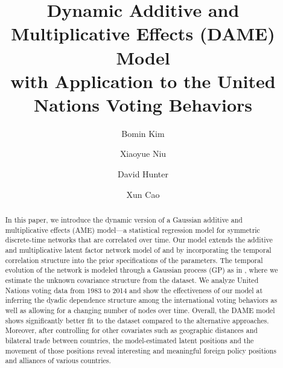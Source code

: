 \documentclass[a4paper]{article}
\title{Dynamic Additive and Multiplicative Effects (DAME) Model\\
	with Application to the United Nations Voting Behaviors}
\author[1]{Bomin Kim}
\author[1]{Xiaoyue Niu}
\author[1]{David Hunter}
\author[2]{Xun Cao}
\affil[1]{Department of Statistics, The Pennsylvania State University}
\affil[2]{Department of Political Science, The Pennsylvania State University}
\date{}
\begin{document}
	\maketitle
	\begin{abstract}
		\noindent  
		In this paper, we introduce the dynamic version of a Gaussian additive and multiplicative effects (AME) model---a statistical regression model for symmetric discrete-time networks that are correlated over time. Our model extends the additive and multiplicative latent factor network model of \cite{hoff2009multiplicative} and \cite{minhas2016inferential} by incorporating the temporal correlation structure into the prior specifications of the parameters. The temporal evolution of the network is modeled through a Gaussian process (GP) as in \cite{durante2013nonparametric}, where we estimate the unknown covariance structure from the dataset. We analyze United Nations voting data from 1983 to 2014 \citep{12379_2016} and show the effectiveness of our model at inferring the dyadic dependence structure among the international voting behaviors as well as allowing for a changing number of nodes over time. Overall, the DAME model shows significantly better fit to the dataset compared to the alternative approaches. Moreover, after controlling for other covariates such as geographic distances and bilateral trade between countries, the model-estimated latent positions and the movement of those positions reveal interesting and meaningful foreign policy positions and alliances of various countries. 
	\end{abstract}
\end{document}
